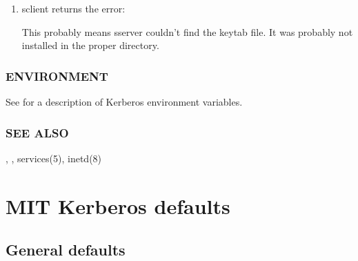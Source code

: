 \documentclass[letterpaper,10pt,english]{sphinxmanual}
\begin{document}
\begin{enumerate}
\sphinxAtStartPar
This means that the  service was not
defined in the Kerberos database; it should be created using
{\hyperref[\detokenize{admin/admin_commands/kadmin_local:kadmin-1}]{}}, and a keytab file needs to be generated to make
the key for that service principal available for sclient.

\item {} 
\sphinxAtStartPar
sclient returns the error:

\begin{sphinxVerbatim}[commandchars=\\\{\}]
    
\end{sphinxVerbatim}

\sphinxAtStartPar
This probably means sserver couldn’t find the keytab file.  It was
probably not installed in the proper directory.

\end{enumerate}


\subsection{ENVIRONMENT}
\label{\detokenize{admin/admin_commands/sserver:environment}}
\sphinxAtStartPar
See  for a description of Kerberos environment
variables.


\subsection{SEE ALSO}
\label{\detokenize{admin/admin_commands/sserver:see-also}}
\sphinxAtStartPar
{}, , services(5), inetd(8)

\sphinxstepscope


\chapter{MIT Kerberos defaults}
\label{\detokenize{mitK5defaults:mit-kerberos-defaults}}\label{\detokenize{mitK5defaults:mitk5defaults}}\label{\detokenize{mitK5defaults::doc}}

\section{General defaults}
\label{\detokenize{mitK5defaults:general-defaults}}
\end{document}

